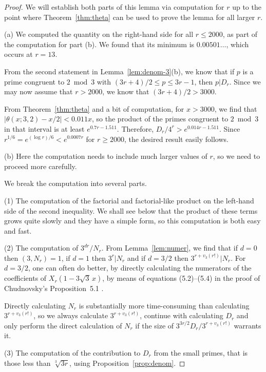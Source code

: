 \documentclass{jT}
\theoremstyle{definition}
\begin{document}
\begin{proof}
We will establish both parts of this lemma via computation 
for $r$ up to the point where Theorem~\ref{thm:theta} can be used
to prove the lemma for all larger $r$.

(a) We computed the quantity on the right-hand side for all $r \leq 2000$,
as part of the computation for part (b). We found that its minimum is
$0.00501 \ldots$, which occurs at $r=13$.

From the second statement in Lemma~\ref{lem:denom-3}(b), we know that if
$p$ is a prime congruent to $2 \bmod 3$ with $(3r+4)/2 \leq p \leq 3r-1$,
then $p | D_{r}$. Since we may now assume that $r > 2000$, we know that
$(3r+4)/2 > 3000$.

From Theorem~\ref{thm:theta} and a bit of computation, for $x > 3000$, we
find that $|\theta(x;3,2)-x/2|<0.011x$, so the product of the primes congruent
to $2 \bmod 3$ in that interval is at least $e^{0.7r-1.511}$. Therefore,
$D_{r}/4^{r}>e^{0.014r-1.511}$. Since $r^{1/6} = e^{(\log r)/6}<e^{0.0007r}$
for $r \geq 2000$, the desired result easily follows.

(b) Here the computation needs to include much larger values of $r$,
so we need to proceed more carefully.

We break the computation into several parts.

(1) The computation of the factorial and factorial-like product on the left-hand side of the
second inequality. We shall see below that the product of these terms grows quite slowly and
they have a simple form, so this computation is both easy and fast.

(2) The computation of $3^{dr}/N_{r}$. From Lemma~\ref{lem:numer}, we find that if $d=0$ 
then $\left( 3, N_{r} \right) = 1$, if $d=1$ then $3^{r} | N_{r}$ and if $d=3/2$ then
$3^{r+v_{3}(r!)} | N_{r}$. For $d=3/2$, one can often do better, by directly calculating
the numerators of the coefficients of $X_{r}(1-3\sqrt{3}\, x)$, by means of equations
(5.2)--(5.4) in the proof of Chudnovsky's Proposition~5.1 \cite{Chud}.

Directly calculating $N_{r}$ is substantially more time-consuming than calculating 
$3^{r+v_{3}(r!)}$, so we always calculate $3^{r+v_{3}(r!)}$, continue with
calculating $D_{r}$ and only perform the direct calculation of $N_{r}$ if the
size of $3^{3r/2}D_{r}/3^{r+v_{3}(r!)}$ warrants it.

(3) The computation of the contribution to $D_{r}$ from the small primes, that is those
less than $\sqrt[3]{3r}$, using Proposition~\ref{prop:denom}.


\end{proof}
\end{document}
